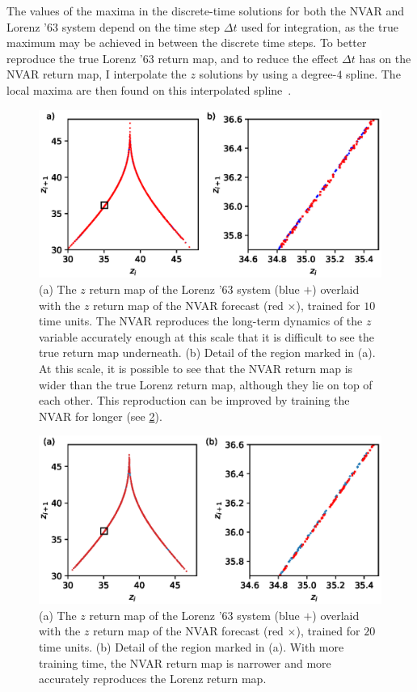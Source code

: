 The values of the maxima in the discrete-time solutions for both the
NVAR and Lorenz '63 system depend on the time step $\Delta t$ used for
integration, as the true maximum may be achieved in between the
discrete time steps. To better reproduce the true Lorenz '63 return
map, and to reduce the effect $\Delta t$ has on the NVAR return map,
I interpolate the $z$ solutions by using a degree-$4$ spline. The
local maxima are then found on this interpolated spline~\cite{dierckx1995}.

\begin{figure}
  \includegraphics{figures/nvar-lorenz-rmap}
  \caption{(a) The $z$ return map of the Lorenz '63 system (blue $+$)
    overlaid with the $z$ return map of the NVAR forecast (red
    $\times$), trained for $10$ time units. The NVAR reproduces the
    long-term dynamics of the $z$ variable accurately enough at this
    scale that it is difficult to see the true return map
    underneath. (b) Detail of the region marked in (a). At this scale,
    it is possible to see that the NVAR return map is wider than the
    true Lorenz return map, although they lie on top of each
    other. This reproduction can be improved by training the NVAR for
    longer (see \cref{fig:nvar-lorenz-rmap-extra}).}
  \label{fig:nvar-lorenz-rmap}
\end{figure}

\begin{figure}
  \includegraphics{figures/nvar-lorenz-rmap-extra}
  \caption{(a) The $z$ return map of the Lorenz '63 system (blue $+$)
    overlaid with the $z$ return map of the NVAR forecast (red
    $\times$), trained for $20$ time units. (b) Detail of the
    region marked in (a). With more training time, the NVAR return map
    is narrower and more accurately reproduces the Lorenz return
    map.}
  \label{fig:nvar-lorenz-rmap-extra}
\end{figure}

